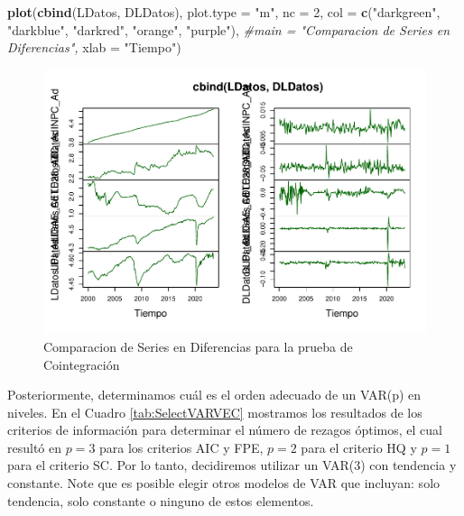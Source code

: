 \documentclass[
]{book}
\newenvironment{Shaded}{\begin{snugshade}}{\end{snugshade}}
\newcommand{\AttributeTok}[1]{\textcolor[rgb]{0.13,0.29,0.53}{#1}}
\newcommand{\CommentTok}[1]{\textcolor[rgb]{0.56,0.35,0.01}{\textit{#1}}}
\newcommand{\DecValTok}[1]{\textcolor[rgb]{0.00,0.00,0.81}{#1}}
\newcommand{\FunctionTok}[1]{\textcolor[rgb]{0.13,0.29,0.53}{\textbf{#1}}}
\newcommand{\NormalTok}[1]{#1}
\newcommand{\StringTok}[1]{\textcolor[rgb]{0.31,0.60,0.02}{#1}}
\begin{document}
\begin{Shaded}
\begin{Highlighting}[]
\FunctionTok{plot}\NormalTok{(}\FunctionTok{cbind}\NormalTok{(LDatos, DLDatos), }
     \AttributeTok{plot.type =} \StringTok{"m"}\NormalTok{, }\AttributeTok{nc =} \DecValTok{2}\NormalTok{,}
     \AttributeTok{col =} \FunctionTok{c}\NormalTok{(}\StringTok{"darkgreen"}\NormalTok{, }\StringTok{"darkblue"}\NormalTok{, }\StringTok{"darkred"}\NormalTok{, }\StringTok{"orange"}\NormalTok{, }\StringTok{"purple"}\NormalTok{), }
     \CommentTok{\#main = "Comparacion de Series en Diferencias", }
     \AttributeTok{xlab =} \StringTok{"Tiempo"}\NormalTok{)}
\end{Highlighting}
\end{Shaded}

\begin{figure}

{\centering \includegraphics{Notas-Series-Tiempo_files/figure-latex/fig83-1} 

}

\caption{Comparacion de Series en Diferencias para la prueba de Cointegración}\label{fig:fig83}
\end{figure}

Posteriormente, determinamos cuál es el orden adecuado de un VAR(p) en
niveles. En el Cuadro \ref{tab:SelectVARVEC} mostramos los resultados
de los criterios de información para determinar el número de rezagos
óptimos, el cual resultó en \(p = 3\) para los criterios AIC y FPE,
\(p = 2\) para el criterio HQ y \(p = 1\) para el criterio SC. Por lo tanto,
decidiremos utilizar un VAR(3) con tendencia y constante. Note que es
posible elegir otros modelos de VAR que incluyan: solo tendencia, solo
constante o ninguno de estos elementos.
\end{document}
